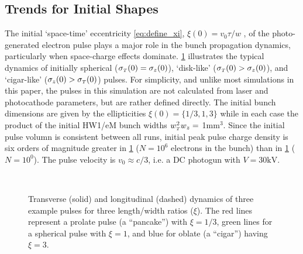 \subsection{Trends for Initial Shapes}

The initial `space-time' eccentricity \ref{eq:define_xi}, $\xi ( 0 ) = v_{{ \scriptscriptstyle 0}} \tau / w $ , of the photo-generated electron pulse plays a major role in the bunch propagation dynamics, particularly when space-charge effects dominate.
\ref{fig:compare_shape} illustrates the typical dynamics of initially spherical ($ \sigma_{ {\scriptscriptstyle T} }(0) = \sigma_{z} ( 0 ) $), `disk-like' ($ \sigma_{ {\scriptscriptstyle T} } ( 0 ) > \sigma_{ z } ( 0 ) $), and `cigar-like' ($ \sigma_{ z } ( 0 ) > \sigma_{ {\scriptscriptstyle T} } ( 0 ) $) pulses.
For simplicity, and unlike most simulations in this paper, the pulses in this simulation are not calculated from laser and photocathode parameters, but are rather defined directly.
The initial bunch dimensions are given by the ellipticities $ \xi(0) = \{ 1/3 , 1 , 3 \} $ while in each case the product of the initial HW1/eM bunch widths $w_{{\scriptscriptstyle T}}^2 w_z = $ 1mm$^3$.
Since the initial pulse volumn is consistent between all runs, initial peak pulse charge density is six orders of magnitude greater in \ref{fig:compare_shape} ($ N = 10^{6} $ electrons in the bunch) than in \ref{fig:compare_shape} ($ N = 10^{0} $).
The pulse velocity is $ v_{{ \scriptscriptstyle 0}} \approx c/3 $, i.e. a DC photogun with $V = 30\text{kV} $.

\begin{figure}
  \centering
  \subfloat[][]{
    \label{fig:compare_shape_N1}
    
  }
  \\
  \subfloat[][]{
    \label{fig:compare_shape_N1e6}
    
  }
  \caption{
    Transverse (solid) and longitudinal (dashed) dynamics of three example pulses for three length/width ratios ($\xi$). 
    The red lines represent a prolate pulse (a ``pancake'') with $\xi=1/3$, green lines for a spherical pulse with $\xi=1$, and blue for oblate (a ``cigar'') having $\xi=3$.
  }
  \label{fig:compare_shape}
\end{figure}

